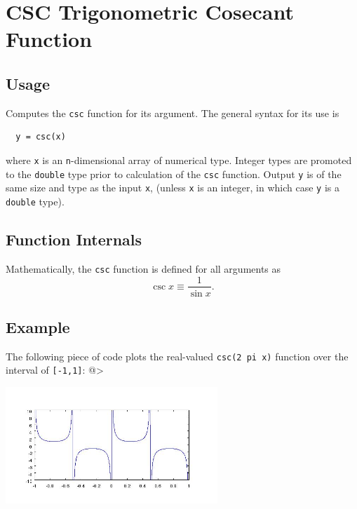 \section{CSC Trigonometric Cosecant Function}

\subsection{Usage}

Computes the \verb|csc| function for its argument.  The general
syntax for its use is
\begin{verbatim}
  y = csc(x)
\end{verbatim}
where \verb|x| is an \verb|n|-dimensional array of numerical type.
Integer types are promoted to the \verb|double| type prior to
calculation of the \verb|csc| function.  Output \verb|y| is of the
same size and type as the input \verb|x|, (unless \verb|x| is an
integer, in which case \verb|y| is a \verb|double| type).  
\subsection{Function Internals}

Mathematically, the \verb|csc| function is defined for all arguments
as
\[
   \csc x \equiv \frac{1}{\sin x}.
\]
\subsection{Example}

The following piece of code plots the real-valued \verb|csc(2 pi x)|
function over the interval of \verb|[-1,1]|:
@>


\centerline{\includegraphics[width=8cm]{cscplot}}

